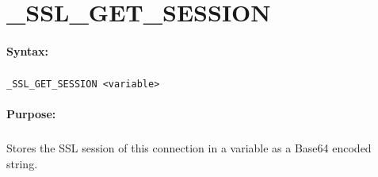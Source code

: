 
\newpage
\section{\_SSL\_GET\_SESSION}
\label{cmd:_SSL_GET_SESSION}

\paragraph{Syntax:}
\subparagraph{}
\texttt{\_SSL\_GET\_SESSION <variable>}

\paragraph{Purpose:}
\subparagraph{}
Stores the SSL session of this connection in a variable as a Base64 encoded string.


